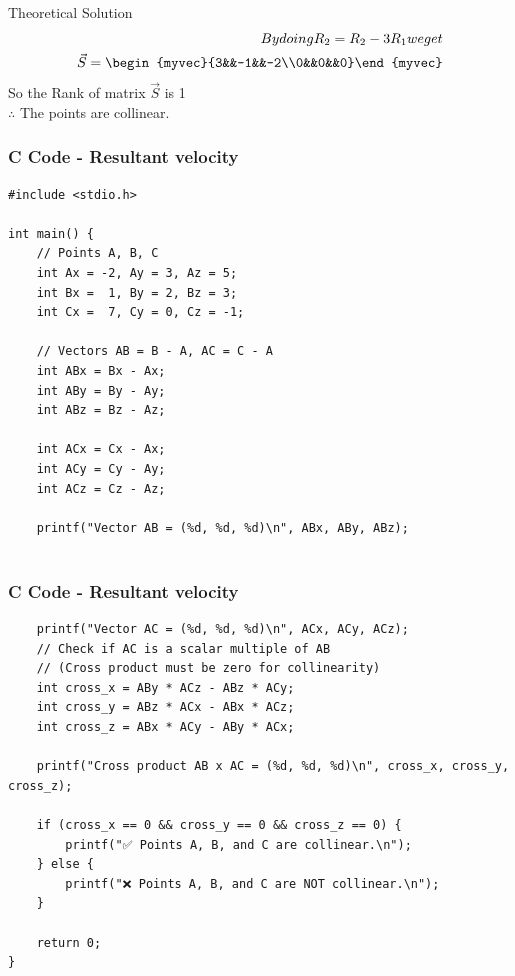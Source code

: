 \documentclass{beamer}
\begin{document}
\begin{frame}{Theoretical Solution}
\begin{align}
By doing R_2=R_2-3R_1 we get \\
   \vec{S}=\begin{myvec}{3&&-1&&-2\\0&&0&&0}\end{myvec}
\end{align}
So the Rank of matrix $\vec{S}$ is 1\\
$\therefore$ The points are collinear.
\end{frame}
\begin{frame}[fragile]
    \frametitle{C Code - Resultant velocity}

    \begin{lstlisting}
#include <stdio.h>

int main() {
    // Points A, B, C
    int Ax = -2, Ay = 3, Az = 5;
    int Bx =  1, By = 2, Bz = 3;
    int Cx =  7, Cy = 0, Cz = -1;

    // Vectors AB = B - A, AC = C - A
    int ABx = Bx - Ax;
    int ABy = By - Ay;
    int ABz = Bz - Az;

    int ACx = Cx - Ax;
    int ACy = Cy - Ay;
    int ACz = Cz - Az;

    printf("Vector AB = (%d, %d, %d)\n", ABx, ABy, ABz);
    
     \end{lstlisting}
\end{frame}
\begin{frame}[fragile]
    \frametitle{C Code - Resultant velocity}

    \begin{lstlisting}
    printf("Vector AC = (%d, %d, %d)\n", ACx, ACy, ACz);
    // Check if AC is a scalar multiple of AB
    // (Cross product must be zero for collinearity)
    int cross_x = ABy * ACz - ABz * ACy;
    int cross_y = ABz * ACx - ABx * ACz;
    int cross_z = ABx * ACy - ABy * ACx;

    printf("Cross product AB x AC = (%d, %d, %d)\n", cross_x, cross_y, cross_z);

    if (cross_x == 0 && cross_y == 0 && cross_z == 0) {
        printf("✅ Points A, B, and C are collinear.\n");
    } else {
        printf("❌ Points A, B, and C are NOT collinear.\n");
    }

    return 0;
}

    \end{lstlisting}
\end{frame}
\end{document}
